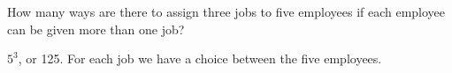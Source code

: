 \documentclass[../main.tex]{subfiles}
\begin{document}
How many ways are there to assign three jobs to five employees if each employee can be given more than one job?

\solution
$5^3$, or 125. For each job we have a choice between the five employees.
\end{document}
